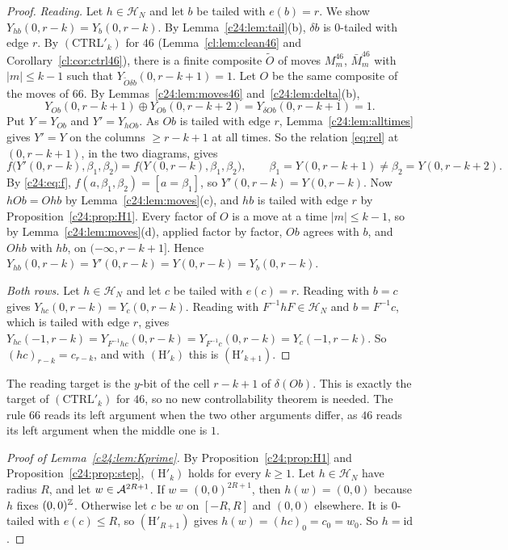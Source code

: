 \begin{proof}
\emph{Reading.} Let $h\in\mathcal H_N$ and let $b$ be tailed with $e(b)=r$. We show $Y_{hb}(0,r-k)=Y_b(0,r-k)$. By Lemma~\ref{c24:lem:tail}(b), $\delta b$ is $0$-tailed with edge $r$. By $(\mathrm{CTRL}'_k)$ for $46$ (Lemma~\ref{cl:lem:clean46} and Corollary~\ref{cl:cor:ctrl46}), there is a finite composite $\tilde O$ of moves $M^{46}_m$, $\bar M^{46}_m$ with $|m|\le k-1$ such that $Y_{\tilde O\delta b}(0,r-k+1)=1$. Let $O$ be the same composite of the moves of $66$. By Lemmas~\ref{c24:lem:moves46} and~\ref{c24:lem:delta}(b),
\[
Y_{Ob}(0,r-k+1)\oplus Y_{Ob}(0,r-k+2)=Y_{\delta Ob}(0,r-k+1)=1.
\]
Put $Y=Y_{Ob}$ and $Y'=Y_{hOb}$. As $Ob$ is tailed with edge $r$, Lemma~\ref{c24:lem:alltimes} gives $Y'=Y$ on the columns $\ge r-k+1$ at all times. So the relation \eqref{eq:rel} at $(0,r-k+1)$, in the two diagrams, gives
\[
f\bigl(Y'(0,r-k),\beta_1,\beta_2\bigr)=f\bigl(Y(0,r-k),\beta_1,\beta_2\bigr),\qquad \beta_1=Y(0,r-k+1)\ne\beta_2=Y(0,r-k+2).
\]
By \eqref{c24:eq:f}, $f(a,\beta_1,\beta_2)=[a=\beta_1]$, so $Y'(0,r-k)=Y(0,r-k)$. Now $hOb=Ohb$ by Lemma~\ref{c24:lem:moves}(c), and $hb$ is tailed with edge $r$ by Proposition~\ref{c24:prop:H1}. Every factor of $O$ is a move at a time $|m|\le k-1$, so by Lemma~\ref{c24:lem:moves}(d), applied factor by factor, $Ob$ agrees with $b$, and $Ohb$ with $hb$, on $(-\infty,r-k+1]$. Hence $Y_{hb}(0,r-k)=Y'(0,r-k)=Y(0,r-k)=Y_b(0,r-k)$.

\emph{Both rows.} Let $h\in\mathcal H_N$ and let $c$ be tailed with $e(c)=r$. Reading with $b=c$ gives $Y_{hc}(0,r-k)=Y_c(0,r-k)$. Reading with $F^{-1}hF\in\mathcal H_N$ and $b=F^{-1}c$, which is tailed with edge $r$, gives $Y_{hc}(-1,r-k)=Y_{F^{-1}hc}(0,r-k)=Y_{F^{-1}c}(0,r-k)=Y_c(-1,r-k)$. So $(hc)_{r-k}=c_{r-k}$, and with $(\mathrm H'_k)$ this is $(\mathrm H'_{k+1})$.
\end{proof}

The reading target is the $y$-bit of the cell $r-k+1$ of $\delta(Ob)$. This is exactly the target of $(\mathrm{CTRL}'_k)$ for $46$, so no new controllability theorem is needed. The rule $66$ reads its left argument when the two other arguments differ, as $46$ reads its left argument when the middle one is $1$.

\begin{proof}[Proof of Lemma~\ref{c24:lem:Kprime}]
By Proposition~\ref{c24:prop:H1} and Proposition~\ref{c24:prop:step}, $(\mathrm H'_k)$ holds for every $k\ge1$. Let $h\in\mathcal H_N$ have radius $R$, and let $w\in\mathcal{A}^{2R+1}$. If $w=(0,0)^{2R+1}$, then $h(w)=(0,0)$ because $h$ fixes $(0,0)^{\mathbb{Z}}$. Otherwise let $c$ be $w$ on $[-R,R]$ and $(0,0)$ elsewhere. It is $0$-tailed with $e(c)\le R$, so $(\mathrm H'_{R+1})$ gives $h(w)=(hc)_0=c_0=w_0$. So $h=\mathrm{id}$.
\end{proof}

